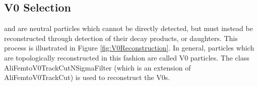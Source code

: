 \documentclass[/home/jesse/Analysis/FemtoAnalysis/AnalysisNotes/AnalysisNoteJBuxton.tex]{subfiles}
\begin{document}
\subsection{V0 Selection}
\label{V0Selection}

\LamALam and \Ks are neutral particles which cannot be directly detected, but must instead be reconstructed through detection of their decay products, or daughters.  
This process is illustrated in Figure \ref{fig:V0Reconstruction}.
In general, particles which are topologically reconstructed in this fashion are called V0 particles.
The class AliFemtoV0TrackCutNSigmaFilter (which is an extension of AliFemtoV0TrackCut) is used to reconstruct the V0s.

\end{document}
